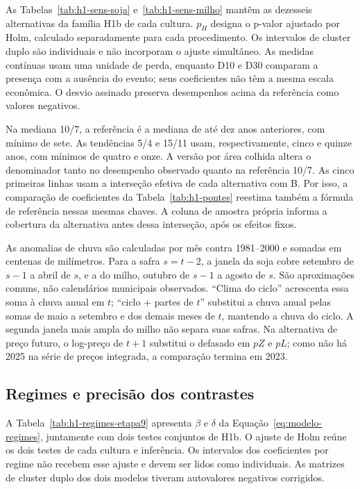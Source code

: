 
\FloatBarrier

As Tabelas~\ref{tab:h1-sens-soja} e~\ref{tab:h1-sens-milho} mantêm as dezesseis alternativas da família H1b de cada cultura. $p_H$ designa o p-valor ajustado por Holm, calculado separadamente para cada procedimento. Os intervalos de cluster duplo são individuais e não incorporam o ajuste simultâneo. As medidas contínuas usam uma unidade de perda, enquanto D10 e D30 comparam a presença com a ausência do evento; seus coeficientes não têm a mesma escala econômica. O desvio assinado preserva desempenhos acima da referência como valores negativos.

Na mediana 10/7, a referência é a mediana de até dez anos anteriores, com mínimo de sete. As tendências 5/4 e 15/11 usam, respectivamente, cinco e quinze anos, com mínimos de quatro e onze. A versão por área colhida altera o denominador tanto no desempenho observado quanto na referência 10/7. As cinco primeiras linhas usam a interseção efetiva de cada alternativa com B. Por isso, a comparação de coeficientes da Tabela~\ref{tab:h1-pontes} reestima também a fórmula de referência nessas mesmas chaves. A coluna de amostra própria informa a cobertura da alternativa antes dessa interseção, após os efeitos fixos.


\FloatBarrier

\FloatBarrier

\FloatBarrier

As anomalias de chuva são calculadas por mês contra 1981--2000 e somadas em centenas de milímetros. Para a safra $s=t-2$, a janela da soja cobre setembro de $s-1$ a abril de $s$, e a do milho, outubro de $s-1$ a agosto de $s$. São aproximações comuns, não calendários municipais observados. ``Clima do ciclo'' acrescenta essa soma à chuva anual em $t$; ``ciclo + partes de $t$'' substitui a chuva anual pelas somas de maio a setembro e dos demais meses de $t$, mantendo a chuva do ciclo. A segunda janela mais ampla do milho não separa suas safras. Na alternativa de preço futuro, o log-preço de $t+1$ substitui o defasado em $pZ$ e $pL$; como não há 2025 na série de preços integrada, a comparação termina em 2023.

\subsection{Regimes e precisão dos contrastes}

A Tabela~\ref{tab:h1-regimes-etapa9} apresenta $\beta$ e $\delta$ da Equação~\eqref{eq:modelo-regimes}, juntamente com dois testes conjuntos de H1b. O ajuste de Holm reúne os dois testes de cada cultura e inferência. Os intervalos dos coeficientes por regime não recebem esse ajuste e devem ser lidos como individuais. As matrizes de cluster duplo dos dois modelos tiveram autovalores negativos corrigidos.

